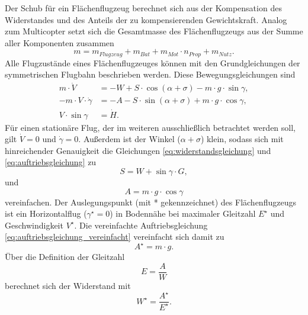 Der Schub für ein Flächenflugzeug berechnet sich aus der Kompensation des Widerstandes und des Anteils der zu kompensierenden Gewichtskraft. Analog zum Multicopter setzt sich die Gesamtmasse des Flächenflugzeugs aus der Summe aller Komponenten zusammen
\begin{equation}
	m = m_{Flugzeug}+m_{Bat}+m_{Mot}\cdot n_{Prop}+m_{Nutz}.
\end{equation}
Alle Flugzustände eines Flächenflugzeuges können mit den Grundgleichungen der symmetrischen Flugbahn beschrieben werden. Diese Bewegungsgleichungen \cite[S.77]{Bruning.1986} sind
\begin{align}
	m\cdot \dot{V} &= -W + S\cdot\cos(\alpha+\sigma)-m\cdot g\cdot\sin\gamma , \label{eq:widerstandsgleichung} \\ 
	-m\cdot V\cdot\dot{\gamma} &= -A - S\cdot\sin(\alpha+\sigma)+m\cdot g\cdot\cos\gamma , \label{eq:auftriebsgleichung} \\ 
	V\cdot\sin\gamma &= \dot{H}. \label{eq:steiggleichung}
\end{align}	
Für einen stationäre Flug, der im weiteren ausschließlich betrachtet werden soll, gilt \ensuremath{\dot{V} = 0} und \ensuremath{\dot{\gamma} = 0}. Außerdem ist der Winkel (\ensuremath{\alpha + \sigma}) klein, sodass sich mit hinreichender Genauigkeit die Gleichungen \ref{eq:widerstandsgleichung} und \ref{eq:auftriebsgleichung} zu
\begin{equation}
	S = W + \sin\gamma\cdot G, 
	\label{eq:widerstandsgleichung_vereinfacht}
\end{equation}
und
\begin{equation}
	A = m\cdot g\cdot\cos\gamma 
	\label{eq:auftriebsgleichung_vereinfacht}
\end{equation} 
vereinfachen. Der Auslegungspunkt (mit * gekennzeichnet) des Flächenflugzeugs ist ein Horizontalflug (\ensuremath{\gamma^\star = 0}) in Bodennähe bei maximaler Gleitzahl \ensuremath{E^\star} und Geschwindigkeit \ensuremath{V^\star}. Die vereinfachte Auftriebsgleichung \ref{eq:auftriebsgleichung_vereinfacht} vereinfacht sich damit zu
\begin{equation}
	A^\star = m\cdot g .
\end{equation}
Über die Definition der Gleitzahl \cite[S.49]{Bruning.1986}
\begin{equation}
	E = \frac{A}{W}
	\label{eq:gleitzahl}
\end{equation}
berechnet sich der Widerstand mit
\begin{equation}
	W^\star = \frac{A^\star}{E^\star} .
\end{equation}
